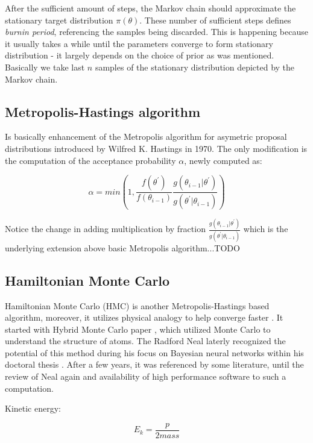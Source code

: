 \documentclass[
  digital, %
  table,   %
  twoside, %
  12pt,
  lof,     %
  lot,     %
]{fithesis3}
\begin{document}
After the sufficient amount of steps, the Markov 
chain should approximate the stationary target 
distribution $\pi(\theta)$. These number of 
sufficient steps defines \textit{burnin period}, 
referencing the samples being discarded. This 
is happening because it usually takes a while 
until the parameters converge to form 
stationary distribution - it largely 
depends on the choice of prior as was mentioned. 
Basically we take last $n$ samples of the 
stationary distribution depicted by the 
Markov chain.


\subsection{Metropolis-Hastings algorithm}

Is basically enhancement of the Metropolis algorithm 
for asymetric proposal distributions introduced by 
Wilfred K. Hastings in 1970. 
The only modification is the computation of the acceptance 
probability $\alpha$, newly computed as:

\begin{equation}
  \alpha = min\left(1, \frac{f(\theta^{\prime})}{f(\theta_{i-1})} \frac{g(\theta_{i-1} | \theta^{\prime})}{g(\theta^{\prime} | \theta_{i-1})}\right)  
\end{equation}

Notice the change in adding multiplication by fraction 
$\frac{g(\theta_{i-1} | \theta^{\prime})}{g(\theta^{\prime} | \theta_{i-1})}$ 
which is the underlying extension above basic Metropolis 
algorithm...TODO


\subsection{Hamiltonian Monte Carlo}

Hamiltonian Monte Carlo (HMC) is another Metropolis-Hastings 
based algorithm, moreover, it utilizes physical analogy to 
help converge faster \cite{betancourt2018}. 
It started with Hybrid Monte Carlo paper \cite{duane1987}, 
which utilized Monte Carlo to understand the structure 
of atoms. 
The Radford Neal laterly recognized the potential of 
this method during his focus on Bayesian neural networks 
within his doctoral thesis \cite{neil1995}. 
After a few years, it was referenced by some literature, 
until the review of Neal again \cite{neil2011} and availability 
of high performance software to such a computation.

Kinetic energy:

\begin{equation}
E_k = \frac{p}{2mass}
\end{equation}
\end{document}
